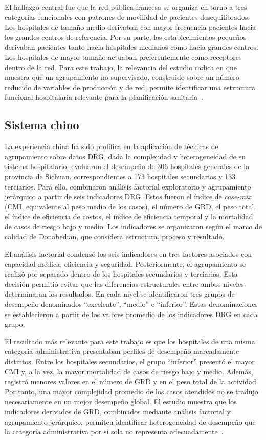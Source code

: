 El hallazgo central fue que la red pública francesa se organiza en torno a tres
categorías funcionales con patrones de movilidad de pacientes desequilibrados.
Los hospitales de tamaño medio derivaban con mayor frecuencia pacientes hacia
los grandes centros de referencia. Por su parte, los establecimientos pequeños
derivaban pacientes tanto hacia hospitales medianos como hacia grandes centros.
Los hospitales de mayor tamaño actuaban preferentemente como receptores dentro de
la red. Para este trabajo, la relevancia del estudio radica en que muestra que un
agrupamiento no supervisado, construido sobre un número reducido de variables de
producción y de red, permite identificar una estructura funcional hospitalaria
relevante para la planificación sanitaria~\citep{Chrusciel2021}.

\subsection{Sistema chino}

\label{sec:china}

La experiencia china ha sido prolífica en la aplicación de técnicas de
agrupamiento sobre datos DRG, dada la complejidad y heterogeneidad de su sistema
hospitalario. \citet{Liu2025} evaluaron el desempeño de 306 hospitales generales
de la provincia de Sichuan, correspondientes a 173 hospitales secundarios y 133
terciarios. Para ello, combinaron análisis factorial exploratorio y agrupamiento
jerárquico a partir de seis indicadores DRG. Estos fueron el índice de
\textit{case-mix} (CMI, equivalente al peso medio de los casos), el número de GRD, el peso total, el índice de eficiencia de costos,
el índice de eficiencia temporal y la mortalidad de casos de riesgo bajo y medio.
Los indicadores se organizaron según el marco de calidad de Donabedian, que
considera estructura, proceso y resultado.

El análisis factorial condensó los seis indicadores en tres factores asociados
con capacidad médica, eficiencia y seguridad. Posteriormente, el agrupamiento se
realizó por separado dentro de los hospitales secundarios y terciarios. Esta
decisión permitió evitar que las diferencias estructurales entre ambos niveles
determinaran los resultados. En cada nivel se identificaron tres grupos de
desempeño denominados ``excelente'', ``medio'' e ``inferior''. Estas
denominaciones se establecieron a partir de los valores promedio de los
indicadores DRG en cada grupo.

El resultado más relevante para este trabajo es que los hospitales de una misma
categoría administrativa presentaban perfiles de desempeño marcadamente
distintos. Entre los hospitales secundarios, el grupo ``inferior'' presentó el
mayor CMI y, a la vez, la mayor mortalidad de casos de riesgo
bajo y medio. Además, registró menores valores en el número de GRD y en el peso
total de la actividad. Por tanto, una mayor complejidad promedio de los casos
atendidos no se tradujo necesariamente en un mejor desempeño global. El estudio
muestra que los indicadores derivados de GRD, combinados mediante análisis
factorial y agrupamiento jerárquico, permiten identificar heterogeneidad de
desempeño que la categoría administrativa por sí sola no representa
adecuadamente~\citep{Liu2025}.

